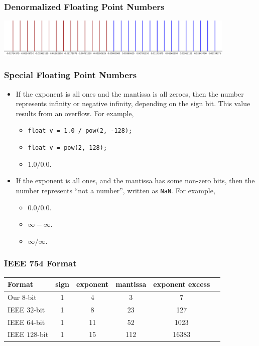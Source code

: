 \documentclass{beamer}
\begin{document}
\begin{frame}%
\frametitle{Denormalized Floating Point Numbers}

\begin{center}
  \includegraphics[width=11.5cm]{denormalized.png}
\end{center}

\end{frame}

\begin{frame}%
\frametitle{Special Floating Point Numbers}

\begin{itemize}

\item If the exponent is all ones and the mantissa is all zeroes, then the number represents infinity or negative infinity, depending on the sign bit.
  This value results from an overflow. For example,
  \begin{itemize}
  \item \lstinline+float v = 1.0 / pow(2, -128);+
  \item \lstinline+float v = pow(2, 128);+
  \item $1.0 / 0.0$.
  \end{itemize}

\vspace{0.5cm}

\item If the exponent is all ones, and the mantissa has some non-zero bits, then the number represents ``not a number'', written as \texttt{NaN}.
  For example,
  \begin{itemize}
  \item $0.0 / 0.0$.
  \item $\infty - \infty$.
  \item $\infty / \infty$.
  \end{itemize}

\end{itemize}

\end{frame}

\begin{frame}%
\frametitle{IEEE 754 Format}

\begin{tabular}{|l|c|c|c|c|c|}
  \hline
  Format & sign & exponent & mantissa & exponent excess\\
  \hline
  \hline
  Our $8$-bit & 1 & 4 & 3 & 7\\
  \hline
  IEEE $32$-bit & 1 & 8 & 23 & 127\\
  \hline
  IEEE $64$-bit & 1 & 11 & 52 & 1023\\
  \hline
  IEEE $128$-bit & 1 & 15 & 112 & 16383\\
  \hline
\end{tabular}

\end{frame}
\end{document}
